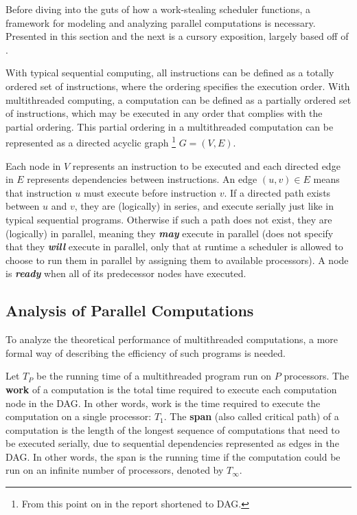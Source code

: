 \documentclass[bsc,frontabs,singlespacing,parskip,deptreport,normalheadings]{infthesis}
\begin{document}
Before diving into the guts of how a work-stealing scheduler functions, a
framework for modeling and analyzing parallel computations is necessary.
Presented in this section and the next is a cursory exposition, largely based
off of \cite{cormen_introduction_2009, herlihy_art_2012,
blumofe_executing_1995}.

With typical sequential computing, all instructions can be defined as a
totally ordered set of instructions, where the ordering specifies the
execution order. With multithreaded computing, a computation can be defined
as a partially ordered set of instructions, which may be executed in any
order that complies with the partial ordering. This partial ordering in a
multithreaded computation can be represented as a directed acyclic graph
\footnote{From this point on in the report shortened to DAG.} \(G = (V, E)\).

Each node in \(V\) represents an instruction to be executed and each directed
edge in \(E\) represents dependencies between instructions. An edge \((u,v) \in
E\) means that instruction \(u\) must execute before instruction \(v\). If a
directed path exists between \(u\) and \(v\), they are (logically) in series,
and execute serially just like in typical sequential programs. Otherwise if such
a path does not exist, they are (logically) in parallel, meaning they
\textit{\textbf{may}} execute in parallel (does not specify that they
\textit{\textbf{will}} execute in parallel, only that at runtime a scheduler is
allowed to choose to run them in parallel by assigning them to available
processors). A node is \textbf{\textit{ready}} when all of its predecessor nodes
have executed.

\subsection{Analysis of Parallel Computations}
\label{subsection:analysis_of_parallel_computations}

To analyze the theoretical performance of multithreaded computations, a more
formal way of describing the efficiency of such programs is needed.

Let \(T_P\) be the running time of a multithreaded program run on \(P\)
processors. The \textbf{work} of a computation is the total time required to
execute each computation node in the DAG. In other words, work is the time
required to execute the computation on a single processor: \(T_1\). The
\textbf{span} (also called critical path) of a computation is the length of the
longest sequence of computations that need to be executed serially, due to
sequential dependencies represented as edges in the DAG. In other words, the
span is the running time if the computation could be run on an infinite number
of processors, denoted by \(T_\infty\).
\end{document}
